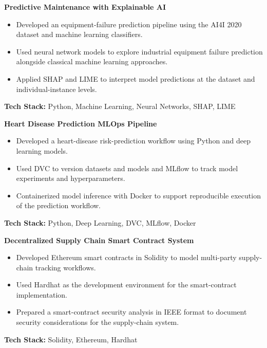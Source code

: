 
\noindent\textbf{Predictive Maintenance with Explainable AI}
\begin{itemize}[leftmargin=*,nosep,topsep=3pt]
  \item Developed an equipment-failure prediction pipeline using the AI4I 2020 dataset and machine learning classifiers.
  \item Used neural network models to explore industrial equipment failure prediction alongside classical machine learning approaches.
  \item Applied SHAP and LIME to interpret model predictions at the dataset and individual-instance levels.
\end{itemize}
\noindent\textbf{Tech Stack:} Python, Machine Learning, Neural Networks, SHAP, LIME\par\medskip

\noindent\textbf{Heart Disease Prediction MLOps Pipeline}
\begin{itemize}[leftmargin=*,nosep,topsep=3pt]
  \item Developed a heart-disease risk-prediction workflow using Python and deep learning models.
  \item Used DVC to version datasets and models and MLflow to track model experiments and hyperparameters.
  \item Containerized model inference with Docker to support reproducible execution of the prediction workflow.
\end{itemize}
\noindent\textbf{Tech Stack:} Python, Deep Learning, DVC, MLflow, Docker\par\medskip

\noindent\textbf{Decentralized Supply Chain Smart Contract System}
\begin{itemize}[leftmargin=*,nosep,topsep=3pt]
  \item Developed Ethereum smart contracts in Solidity to model multi-party supply-chain tracking workflows.
  \item Used Hardhat as the development environment for the smart-contract implementation.
  \item Prepared a smart-contract security analysis in IEEE format to document security considerations for the supply-chain system.
\end{itemize}
\noindent\textbf{Tech Stack:} Solidity, Ethereum, Hardhat\par\medskip

